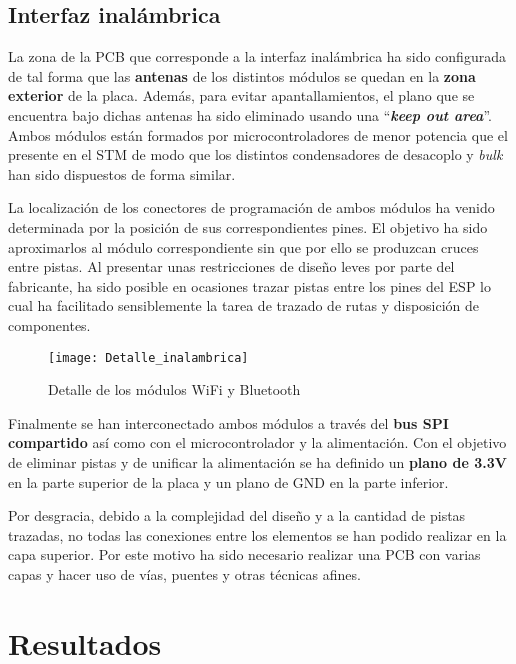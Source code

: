 \subsection{Interfaz inalámbrica\label{sec:PCB_inalambrica}}

La zona de la \acrshort{PCB} que corresponde a la interfaz inalámbrica ha sido configurada de tal forma que las \textbf{antenas} de los distintos módulos se quedan en la \textbf{zona exterior} de la placa. Además, para evitar apantallamientos, el plano que se encuentra bajo dichas antenas ha sido eliminado usando una ``\textit{\textbf{keep out area}}''. Ambos módulos están formados por microcontroladores de menor potencia que el presente en el STM de modo que los distintos condensadores de desacoplo y \textit{bulk} han sido dispuestos de forma similar.

La localización de los conectores de programación de ambos módulos ha venido determinada por la posición de sus correspondientes pines. El objetivo ha sido aproximarlos al módulo correspondiente sin que por ello se produzcan cruces entre pistas. Al presentar unas restricciones de diseño leves por parte del fabricante, ha sido posible en ocasiones trazar pistas entre los pines del ESP lo cual ha facilitado sensiblemente la tarea de trazado de rutas y disposición de componentes.

\clearpage

\begin{figure} [h]
    \centering
    \texttt{[image: Detalle\_inalambrica]}
    \caption{Detalle de los módulos WiFi y Bluetooth}
    \label{fig:Detalle_inalambrica}
\end{figure}

Finalmente se han interconectado ambos módulos a través del \textbf{bus SPI compartido} así como con el microcontrolador y la alimentación. Con el objetivo de eliminar pistas y de unificar la alimentación se ha definido un \textbf{plano de 3.3V} en la parte superior de la placa y un plano de GND en la parte inferior. 

Por desgracia, debido a la complejidad del diseño y a la cantidad de pistas trazadas, no todas las conexiones entre los elementos se han podido realizar en la capa superior. Por este motivo ha sido necesario realizar una PCB con varias capas y hacer uso de vías, puentes y otras técnicas afines. 

\clearpage

\section{Resultados\label{sec:PCB_Resultados}}

